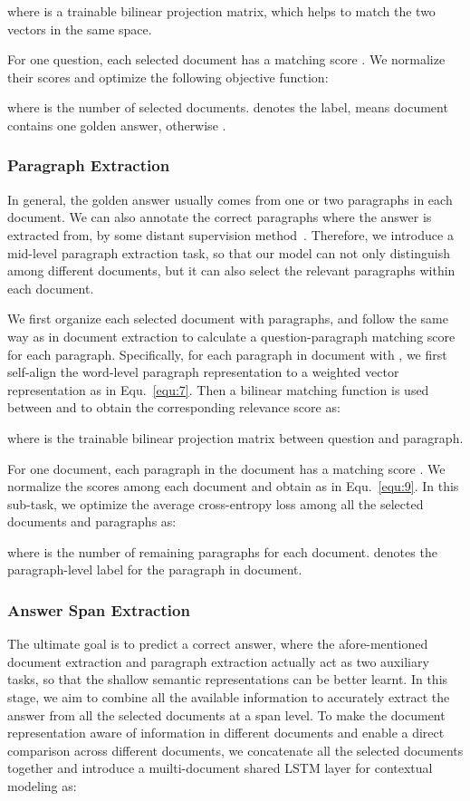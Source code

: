 \documentclass[letterpaper]{article} \usepackage{aaai19}  \usepackage{graphicx}
\begin{document}
where  is a trainable bilinear projection matrix, which helps to match the two vectors in the same space.

For one question, each selected document  has a matching score . We normalize their scores and optimize the following objective function:
\vspace{-2mm}

where  is the number of selected documents.  denotes the label,  means document  contains one golden answer, otherwise .

\subsubsection{Paragraph Extraction}
In general, the golden answer usually comes from one or two paragraphs in each document. We can also annotate the correct paragraphs where the answer is extracted from, by some distant supervision method~\cite{chen2017reading}. Therefore, we introduce a mid-level paragraph extraction task, so that our model can not only distinguish among different documents, but it can also select the relevant paragraphs within each document.  

We first organize each selected document with paragraphs, and follow the same way as in document extraction to calculate a question-paragraph matching score for each paragraph. 
Specifically, for each paragraph in document  with , we first self-align the word-level paragraph representation  to a weighted vector representation  as in Equ.~\ref{equ:7}. Then a bilinear matching function is used between  and  to obtain the corresponding relevance score as:

where  is the trainable bilinear projection matrix between question and paragraph.

For one document, each paragraph  in the document has a matching score . We normalize the scores among each document and obtain  as in Equ.~\ref{equ:9}. In this sub-task, we optimize the average cross-entropy loss among all the selected documents and paragraphs as:

where  is the number of remaining paragraphs for each document.  denotes the paragraph-level label for the  paragraph in  document. 

\subsubsection{Answer Span Extraction}
The ultimate goal is to predict a correct answer, where the afore-mentioned document extraction and paragraph extraction actually act as two auxiliary tasks, so that the shallow semantic representations can be better learnt. In this stage, we aim to combine all the available information to accurately extract the answer from all the selected documents at a span level. To make the document representation aware of information in different documents and enable a direct comparison across different documents, we concatenate all the selected documents together and introduce a muilti-document shared LSTM layer for contextual modeling as:
\end{document}
